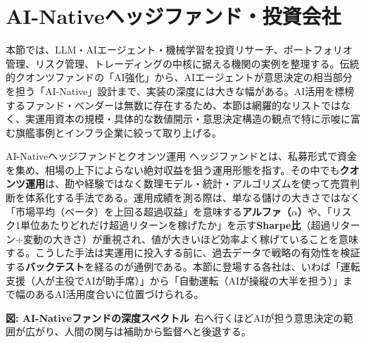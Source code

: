 \section{AI-Nativeヘッジファンド・投資会社}
\label{sec:ai-native-funds}

本節では、LLM・AIエージェント・機械学習を投資リサーチ、ポートフォリオ管理、リスク管理、トレーディングの中核に据える機関の実例を整理する。伝統的クオンツファンドの「AI強化」から、AIエージェントが意思決定の相当部分を担う「AI-Native」設計まで、実装の深度には大きな幅がある。AI活用を標榜するファンド・ベンダーは無数に存在するため、本節は網羅的なリストではなく、実運用資本の規模・具体的な数値開示・意思決定構造の観点で特に示唆に富む旗艦事例とインフラ企業に絞って取り上げる。

\begin{concept}{AI-Nativeヘッジファンドとクオンツ運用}
ヘッジファンドとは、私募形式で資金を集め、相場の上下によらない絶対収益を狙う運用形態を指す。その中でも\textbf{クオンツ運用}は、勘や経験ではなく数理モデル・統計・アルゴリズムを使って売買判断を体系化する手法である。運用成績を測る際は、単なる儲けの大きさではなく「市場平均（ベータ）を上回る超過収益」を意味する\textbf{アルファ（$\alpha$）}や、「リスク1単位あたりどれだけ超過リターンを稼げたか」を示す\textbf{Sharpe比}（超過リターン÷変動の大きさ）が重視され、値が大きいほど効率よく稼げていることを意味する。こうした手法は実運用に投入する前に、過去データで戦略の有効性を検証する\textbf{バックテスト}を経るのが通例である。本節に登場する各社は、いわば「運転支援（人が主役でAIが助手席）」から「自動運転（AIが操縦の大半を担う）」まで幅のあるAI活用度合いに位置づけられる。
\begin{center}
\end{center}
{\small\color{brandgray}\textbf{図: AI-Nativeファンドの深度スペクトル}\ 右へ行くほどAIが担う意思決定の範囲が広がり、人間の関与は補助から監督へと後退する。}
\end{concept}


